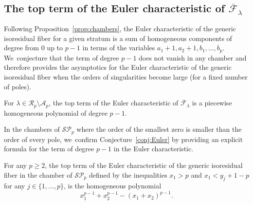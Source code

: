 \subsection{The top term of the Euler characteristic of $\overline{\mathcal F}_\lambda$}\label{sub:Euler}

Following Proposition~\ref{prop:chambers}, the Euler characteristic of the generic isoresidual fiber for a given stratum is a sum of homogeneous components of degree from $0$ up to $p-1$ in terms of the variables $a_{1}+1,a_{2}+1,b_{1},\dots,b_{p}$. We~conjecture that the term of degree $p-1$ does not vanish in any chamber and therefore provides the asymptotics for the Euler characteristic of the generic isoresidual fiber when the orders of singularities become large (for a fixed number of poles).

\begin{conj}\label{conj:Euler}
For $\lambda \in \mathcal{R}_{p} \setminus \mathcal{A}_{p}$, the top term of the Euler characteristic of $\overline{\mathcal F}_\lambda$ is a piecewise homogeneous polynomial of degree $p-1$.
\end{conj}

In the chambers of $\mathcal{SP}_{p}$ where the order of the smallest zero is smaller than the order of every pole, we~confirm Conjecture~\ref{conj:Euler} by providing an explicit formula for the term of degree $p-1$ in the Euler characteristic.

\begin{prop}
\label{prop:one-chamber}
For any $p \geq 2$, the top term of the Euler characteristic of the generic isoresidual fiber in the chamber of $\mathcal{SP}_{p}$ defined by the inequalities $x_{1}>p$ and $x_{1}<y_{j} +1-p$ for any $j \in \lbrace{ 1,\dots,p \rbrace}$, is the homogeneous polynomial
\[
x_{1}^{p-1}+x_{2}^{p-1}-(x_{1}+x_{2})^{p-1}.
\]
\end{prop}

